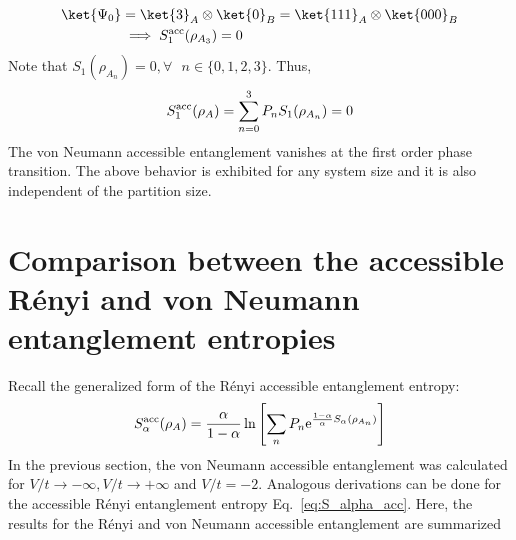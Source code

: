 %
%
%
\begin{align}
\ket{\Psi_0} &=  \ket{3}_A \otimes \ket{0}_B = \ket{111}_A\otimes\ket{000}_B \nonumber \\
&\implies S_1^{\rm acc}(\rho_{A_{3}}) = 0
\end{align}
%
Note that $S_1(\rho_{A_n}) = 0 , \forall\text{ }{n \in \{0,1,2,3\}}$. Thus,
\begin{equation}
S_1^{\rm acc}(\rho_A) = \sum_{n=0}^3 P_n S_1(\rho_{A_n}) = 0
\end{equation}
%
The von Neumann accessible entanglement vanishes at the first order phase transition. The above behavior is exhibited for any system size and it is also independent of the partition size.

\section{Comparison between the accessible R\'enyi and von Neumann entanglement entropies}

Recall the generalized form of the R\'enyi accessible entanglement entropy:
%
\begin{equation}
S_{\alpha}^{{\rm acc}} (\rho_A) = \frac{\alpha}{1-\alpha}\ln\left[ \sum_{n} P_n \mathrm{e}^{\frac{1-\alpha}{\alpha} S_{\alpha}(\rho_{A_n})}\right]
\label{eq:S_alpha_acc}
\end{equation} 
%
In the previous section, the von Neumann accessible entanglement was calculated for $V/t \to -\infty, V/t \to +\infty$ and $V/t = -2$. Analogous derivations can be done for the accessible R\'enyi entanglement entropy Eq.~\eqref{eq:S_alpha_acc}. Here, the results for the R\'enyi and von Neumann accessible entanglement are summarized %


